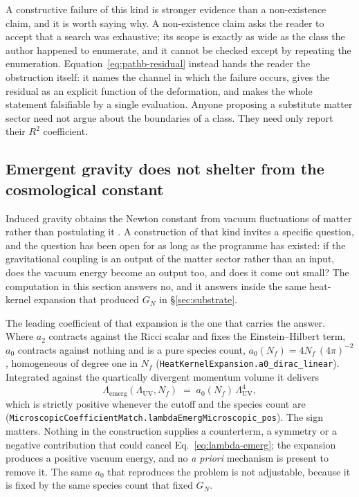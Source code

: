 \documentclass[aps,prd,nofootinbib,superscriptaddress,12pt]{revtex4-2}
\DeclareRobustCommand{\lb}{\discretionary{}{}{}}
\begin{document}
A constructive failure of this kind is stronger evidence than a non-existence
claim, and it is worth saying why. A non-existence claim asks the reader to
accept that a search was exhaustive; its scope is exactly as wide as the class
the author happened to enumerate, and it cannot be checked except by repeating
the enumeration. Equation~\eqref{eq:pathb-residual} instead hands the reader the
obstruction itself: it names the channel in which the failure occurs, gives the
residual as an explicit function of the deformation, and makes the whole
statement falsifiable by a single evaluation. Anyone proposing a substitute
matter sector need not argue about the boundaries of a class. They need only
report their $R^2$ coefficient.

\subsection{Emergent gravity does not shelter from the cosmological constant}
\label{sec:cc}

Induced gravity obtains the Newton constant from vacuum fluctuations of matter
rather than postulating it \cite{Sakharov1968,Adler1980}. A construction of that
kind invites a specific question, and the question has been open for as long as
the programme has existed: if the gravitational coupling is an output of the
matter sector rather than an input, does the vacuum energy become an output too,
and does it come out small? The computation in this section answers no, and it
answers inside the same heat-kernel expansion that produced $G_N$ in
\S\ref{sec:substrate}.

The leading coefficient of that expansion is the one that carries the answer.
Where $a_2$ contracts against the Ricci scalar and fixes the Einstein--Hilbert
term, $a_0$ contracts against nothing and is a pure species count,
$a_0(N_f) = 4N_f\,(4\pi)^{-2}$, homogeneous of degree one in $N_f$
(\texttt{Heat\lb{}Kernel\lb{}Expansion.\lb{}a0\_\lb{}dirac\_\lb{}linear}). Integrated against the
quartically divergent momentum volume it delivers
\begin{equation}
\label{eq:lambda-emerg}
\Lambda_{\mathrm{emerg}}(\Lambda_{\mathrm{UV}}, N_f)
\;=\; a_0(N_f)\,\Lambda_{\mathrm{UV}}^{4} ,
\end{equation}
which is strictly positive whenever the cutoff and the species count are
(\texttt{Microscopic\lb{}Coefficient\lb{}Match.\lb{}lambda\lb{}Emerg\lb{}Microscopic\_\lb{}pos}). The sign
matters. Nothing in the construction supplies a counterterm, a symmetry or a
negative contribution that could cancel Eq.~\eqref{eq:lambda-emerg}; the
expansion produces a positive vacuum energy, and no \emph{a priori} mechanism is
present to remove it. The same $a_0$ that reproduces the problem is not
adjustable, because it is fixed by the same species count that fixed $G_N$.
\end{document}
